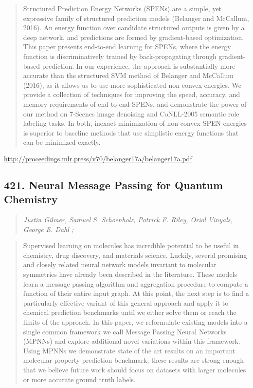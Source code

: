 \documentclass{article}
\begin{document}
\begin{quote}
    Structured Prediction Energy Networks (SPENs) are a simple, yet expressive family of structured prediction models (Belanger and McCallum, 2016). An energy function over candidate structured outputs is given by a deep network, and predictions are formed by gradient-based optimization. This paper presents end-to-end learning for SPENs, where the energy function is discriminatively trained by back-propagating through gradient-based prediction. In our experience, the approach is substantially more accurate than the structured SVM method of Belanger and McCallum (2016), as it allows us to use more sophisticated non-convex energies. We provide a collection of techniques for improving the speed, accuracy, and memory requirements of end-to-end SPENs, and demonstrate the power of our method on 7-Scenes image denoising and CoNLL-2005 semantic role labeling tasks. In both, inexact minimization of non-convex SPEN energies is superior to baseline methods that use simplistic energy functions that can be minimized exactly.  
\end{quote}

\href{http://proceedings.mlr.press/v70/belanger17a/belanger17a.pdf}{http://proceedings.mlr.press/v70/belanger17a/belanger17a.pdf}

\subsection{421. Neural Message Passing for Quantum Chemistry}

\begin{quote}
\footnotesize{\textit{Justin Gilmer, Samuel S. Schoenholz, Patrick F. Riley, Oriol Vinyals, George E. Dahl ;}}

\end{quote}

\begin{quote}
    Supervised learning on molecules has incredible potential to be useful in chemistry, drug discovery, and materials science. Luckily, several promising and closely related neural network models invariant to molecular symmetries have already been described in the literature. These models learn a message passing algorithm and aggregation procedure to compute a function of their entire input graph. At this point, the next step is to find a particularly effective variant of this general approach and apply it to chemical prediction benchmarks until we either solve them or reach the limits of the approach. In this paper, we reformulate existing models into a single common framework we call Message Passing Neural Networks (MPNNs) and explore additional novel variations within this framework. Using MPNNs we demonstrate state of the art results on an important molecular property prediction benchmark; these results are strong enough that we believe future work should focus on datasets with larger molecules or more accurate ground truth labels.  
\end{quote}
\end{document}
